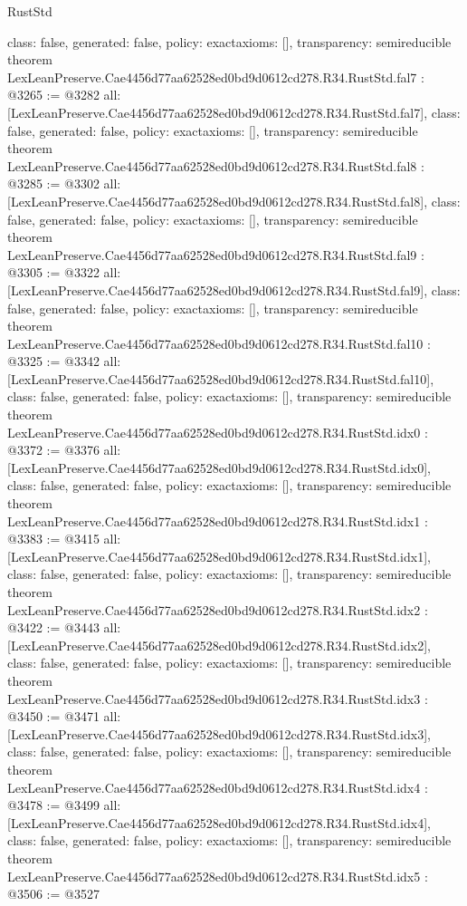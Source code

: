 \begin{lexlean}{RustStd}
\begin{coremodule}
{  class: false,
  generated: false,
  policy: exact{axioms: []},
  transparency: semireducible
}
theorem LexLeanPreserve.Cae4456d77aa62528ed0bd9d0612cd278.R34.RustStd.fal7 : @3265 := @3282 {
  all: [LexLeanPreserve.Cae4456d77aa62528ed0bd9d0612cd278.R34.RustStd.fal7],
  class: false,
  generated: false,
  policy: exact{axioms: []},
  transparency: semireducible
}
theorem LexLeanPreserve.Cae4456d77aa62528ed0bd9d0612cd278.R34.RustStd.fal8 : @3285 := @3302 {
  all: [LexLeanPreserve.Cae4456d77aa62528ed0bd9d0612cd278.R34.RustStd.fal8],
  class: false,
  generated: false,
  policy: exact{axioms: []},
  transparency: semireducible
}
theorem LexLeanPreserve.Cae4456d77aa62528ed0bd9d0612cd278.R34.RustStd.fal9 : @3305 := @3322 {
  all: [LexLeanPreserve.Cae4456d77aa62528ed0bd9d0612cd278.R34.RustStd.fal9],
  class: false,
  generated: false,
  policy: exact{axioms: []},
  transparency: semireducible
}
theorem LexLeanPreserve.Cae4456d77aa62528ed0bd9d0612cd278.R34.RustStd.fal10 : @3325 := @3342 {
  all: [LexLeanPreserve.Cae4456d77aa62528ed0bd9d0612cd278.R34.RustStd.fal10],
  class: false,
  generated: false,
  policy: exact{axioms: []},
  transparency: semireducible
}
theorem LexLeanPreserve.Cae4456d77aa62528ed0bd9d0612cd278.R34.RustStd.idx0 : @3372 := @3376 {
  all: [LexLeanPreserve.Cae4456d77aa62528ed0bd9d0612cd278.R34.RustStd.idx0],
  class: false,
  generated: false,
  policy: exact{axioms: []},
  transparency: semireducible
}
theorem LexLeanPreserve.Cae4456d77aa62528ed0bd9d0612cd278.R34.RustStd.idx1 : @3383 := @3415 {
  all: [LexLeanPreserve.Cae4456d77aa62528ed0bd9d0612cd278.R34.RustStd.idx1],
  class: false,
  generated: false,
  policy: exact{axioms: []},
  transparency: semireducible
}
theorem LexLeanPreserve.Cae4456d77aa62528ed0bd9d0612cd278.R34.RustStd.idx2 : @3422 := @3443 {
  all: [LexLeanPreserve.Cae4456d77aa62528ed0bd9d0612cd278.R34.RustStd.idx2],
  class: false,
  generated: false,
  policy: exact{axioms: []},
  transparency: semireducible
}
theorem LexLeanPreserve.Cae4456d77aa62528ed0bd9d0612cd278.R34.RustStd.idx3 : @3450 := @3471 {
  all: [LexLeanPreserve.Cae4456d77aa62528ed0bd9d0612cd278.R34.RustStd.idx3],
  class: false,
  generated: false,
  policy: exact{axioms: []},
  transparency: semireducible
}
theorem LexLeanPreserve.Cae4456d77aa62528ed0bd9d0612cd278.R34.RustStd.idx4 : @3478 := @3499 {
  all: [LexLeanPreserve.Cae4456d77aa62528ed0bd9d0612cd278.R34.RustStd.idx4],
  class: false,
  generated: false,
  policy: exact{axioms: []},
  transparency: semireducible
}
theorem LexLeanPreserve.Cae4456d77aa62528ed0bd9d0612cd278.R34.RustStd.idx5 : @3506 := @3527 {
}
\end{coremodule}
\end{lexlean}
